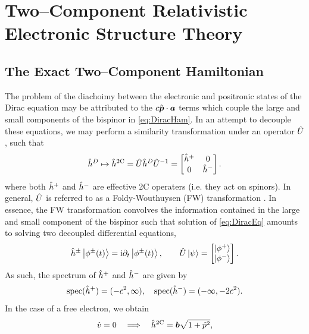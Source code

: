 \chapter{Two--Component Relativistic Electronic Structure Theory}
\label{ch:2CEST}


\section{The Exact Two--Component Hamiltonian}
\label{sec:X2C}

The problem of the diachoimy between the electronic and positronic states of the Dirac
equation may be attributed to the $c \hat{\boldsymbol{p}} \cdot \boldsymbol{a}$ terms which couple the 
large and small components of the bispinor in \cref{eq:DiracHam}. In an attempt
to decouple these equations, we may perform a similarity transformation under an operator $\hat{U}$, such that
\cite{Wolf15_book,Faegri07_book,Liu05_241102,Wouthuysen50_29}
\begin{equation}
\label{eq:FW}
\hat{h}^D \mapsto \hat{h}^{\mathrm{2C}}  = \hat{U} \hat{h}^D \hat{U}^{-1} = \begin{bmatrix} \hat{h}^+ & 0 \\ 0 & \hat{h}^- \end{bmatrix}.
\end{equation}
where both $\hat{h}^+$ and $\hat{h}^-$ are effective 2C operaters (i.e. they act on spinors).
In general, $\hat{U}$ is referred to as a Foldy-Wouthuysen (FW) transformation \cite{Wouthuysen50_29}.
In essence, the FW transformation convolves the information contained in the large and small
component of the bispinor such that solution of \cref{eq:DiracEq} amounts to solving two decoupled 
differential equations,
\begin{align}
\hat{h}^\pm \left\vert  \phi^\pm (t)  \right\rangle = \mathrm i \partial_t \left\vert \phi^\pm (t) \right\rangle, \qquad \hat{U} \left\vert \psi \right\rangle = \begin{bmatrix} \left\vert \phi^+ \right\rangle \\ \left\vert \phi^- \right\rangle \end{bmatrix}.
\end{align}
As such, the spectrum of $\hat{h}^+$ and $\hat{h}^-$ are given by
\begin{equation}
\mathrm{spec}(\hat{h}^+) = (-c^2,\infty), \quad 
\mathrm{spec}(\hat{h}^-) = (-\infty,-2c^2).
\end{equation}
In the case of a free electron, we obtain 
\begin{equation}
\label{eq:NWRep}
\hat{v} = 0 \quad \Longrightarrow \quad \hat{h}^{\mathrm{2C}} = \boldsymbol{b} \sqrt{1 + \hat{p}^2},
\end{equation}
